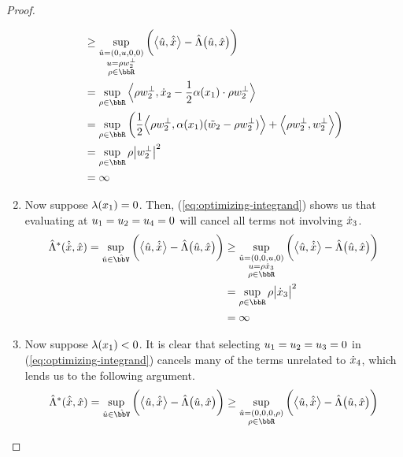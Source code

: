 \begin{proof}
\begin{enumerate}
\begin{align*}
        &\geq \sup_{\substack{\hat\momentVar=(0, \momentVar, 0, 0) \\ \momentVar = \rho w_2^\bot \\ \rho \in \bbR}} \bigg( \bprj{\hat\momentVar}{\hat\diffVar} - \hat\ode\big(\hat\momentVar, \hat\stateVar\big) \bigg) \\
        &= \sup_{\rho\in\bbR} \Bprj{\rho w_2^\bot}{\diffVar_2 - \frac12\affDiff(\stateVar_1) \cdot \rho w_2^\bot} \\
        &= \sup_{\rho\in\bbR} \bigg( \frac12\Bprj{\rho w_2^\bot}{\affDiff(\stateVar_1)(\tilde w_2 - \rho w_2^\bot)} + \Bprj{\rho w_2^\bot}{w_2^\bot} \bigg) \\
        &= \sup_{\rho\in\bbR} \rho \big|w_2^\bot\big|^2 \\
        &= \infty
      \end{align*}
    \item
      Now suppose $\lambda(x_1) = 0$.
      Then, (\ref{eq:optimizing-integrand}) shows us that evaluating at $u_1=u_2=u_4=0$ will cancel all terms not involving $\dot{x}_3$.
      \begin{align*}
        \hat\ode^*(\hat{\diffVar}, \hat\stateVar) 
        = \sup_{\hat\momentVar \in \hat\vecSpace} \bigg( \bprj{\hat\momentVar}{\hat\diffVar} - \hat\ode\big(\hat\momentVar, \hat\stateVar\big) \bigg) 
        &\geq \sup_{\substack{\hat\momentVar=(0, 0, \momentVar, 0)  \\ \momentVar = \rho \diffVar_3 \\ \rho \in \bbR}} \bigg( \bprj{\hat\momentVar}{\hat\diffVar} - \hat\ode\big(\hat\momentVar, \hat\stateVar\big) \bigg) \\
        &= \sup_{\rho\in\bbR} \rho\big|\diffVar_3\big|^2 \\
        &= \infty
      \end{align*}
    \item
      Now suppose $\lambda(x_1) < 0$.
      It is clear that selecting $u_1 = u_2 = u_3 = 0$ in (\ref{eq:optimizing-integrand}) cancels many of the terms unrelated to $\dot{x}_4$, which lends us to the following argument.
      \begin{align*}
        \hat\ode^*(\hat{\diffVar}, \hat\stateVar) 
        = \sup_{\hat\momentVar \in \hat\vecSpace} \bigg( \bprj{\hat\momentVar}{\hat\diffVar} - \hat\ode\big(\hat\momentVar, \hat\stateVar\big) \bigg) 
        &\geq \sup_{\substack{\hat\momentVar=(0, 0, 0, \rho)  \\ \rho \in \bbR}} \bigg( \bprj{\hat\momentVar}{\hat\diffVar} - \hat\ode\big(\hat\momentVar, \hat\stateVar\big) \bigg) \\

\end{align*}
\end{enumerate}
\end{proof}
